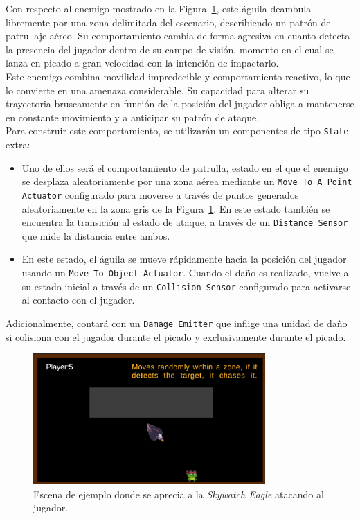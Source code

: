 Con respecto al enemigo mostrado en la Figura~\ref{fig:SkywatchEagle}, este águila deambula libremente por una zona delimitada del escenario, describiendo un patrón de patrullaje aéreo. Su comportamiento cambia de forma agresiva en cuanto detecta la presencia del jugador dentro de su campo de visión, momento en el cual se lanza en picado a gran velocidad con la intención de impactarlo.\\

Este enemigo combina movilidad impredecible y comportamiento reactivo, lo que lo convierte en una amenaza considerable. Su capacidad para alterar su trayectoria bruscamente en función de la posición del jugador obliga a mantenerse en constante movimiento y a anticipar su patrón de ataque.\\

Para construir este comportamiento, se utilizarán un componentes de tipo \texttt{State} extra:

\begin{itemize}
\item Uno de ellos será el comportamiento de patrulla, estado en el que el enemigo se desplaza aleatoriamente por una zona aérea mediante un \texttt{Move To A Point Actuator} configurado para moverse a través de puntos generados aleatoriamente en la zona gris de la  Figura~\ref{fig:SkywatchEagle}. En este estado también se encuentra la transición al estado de ataque, a través de un \texttt{Distance Sensor} que mide la distancia entre ambos. \\
\item En este estado, el águila se mueve rápidamente hacia la posición del jugador usando un \texttt{Move To Object Actuator}. Cuando el daño es realizado, vuelve a su estado inicial a través de un \texttt{Collision Sensor} configurado para activarse al contacto con el jugador.
\end{itemize}

Adicionalmente, contará con un \texttt{Damage Emitter} que inflige una unidad de daño si colisiona con el jugador durante el picado y exclusivamente durante el picado.
\begin{figure}[t]
	\centering
	\includegraphics[height=5cm]{Imagenes/AguilaCayendo.png}
	\caption{Escena de ejemplo donde se aprecia a la \textit{Skywatch Eagle} atacando al jugador.}
	\label{fig:SkywatchEagle}
\end{figure}


